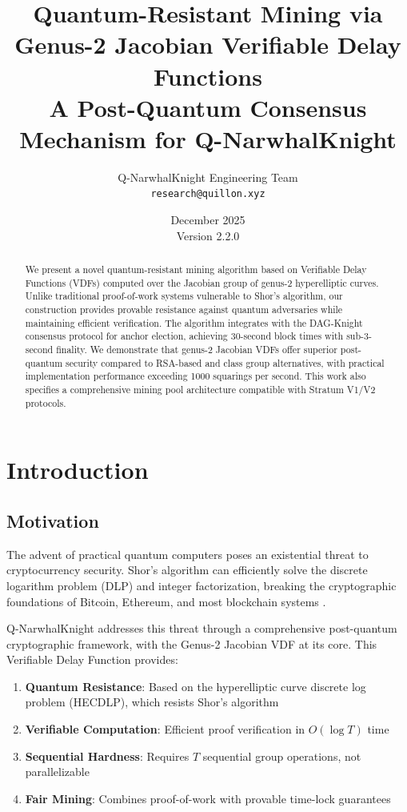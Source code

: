 \documentclass[11pt,a4paper]{article}
\title{\textbf{Quantum-Resistant Mining via Genus-2 Jacobian Verifiable Delay Functions}\\[0.5em]
\large A Post-Quantum Consensus Mechanism for Q-NarwhalKnight}
\author{
    Q-NarwhalKnight Engineering Team\\
    \texttt{research@quillon.xyz}
}
\date{December 2025 \\ Version 2.2.0}
\begin{document}
\maketitle

\begin{abstract}
We present a novel quantum-resistant mining algorithm based on Verifiable Delay Functions (VDFs) computed over the Jacobian group of genus-2 hyperelliptic curves. Unlike traditional proof-of-work systems vulnerable to Shor's algorithm, our construction provides provable resistance against quantum adversaries while maintaining efficient verification. The algorithm integrates with the DAG-Knight consensus protocol for anchor election, achieving 30-second block times with sub-3-second finality. We demonstrate that genus-2 Jacobian VDFs offer superior post-quantum security compared to RSA-based and class group alternatives, with practical implementation performance exceeding 1000 squarings per second. This work also specifies a comprehensive mining pool architecture compatible with Stratum V1/V2 protocols.
\end{abstract}

\tableofcontents
\newpage

\section{Introduction}

\subsection{Motivation}

The advent of practical quantum computers poses an existential threat to cryptocurrency security. Shor's algorithm can efficiently solve the discrete logarithm problem (DLP) and integer factorization, breaking the cryptographic foundations of Bitcoin, Ethereum, and most blockchain systems \cite{shor1994}.

Q-NarwhalKnight addresses this threat through a comprehensive post-quantum cryptographic framework, with the Genus-2 Jacobian VDF at its core. This Verifiable Delay Function provides:

\begin{enumerate}
    \item \textbf{Quantum Resistance}: Based on the hyperelliptic curve discrete log problem (HECDLP), which resists Shor's algorithm
    \item \textbf{Verifiable Computation}: Efficient proof verification in $O(\log T)$ time
    \item \textbf{Sequential Hardness}: Requires $T$ sequential group operations, not parallelizable
    \item \textbf{Fair Mining}: Combines proof-of-work with provable time-lock guarantees
\end{enumerate}
\end{document}
